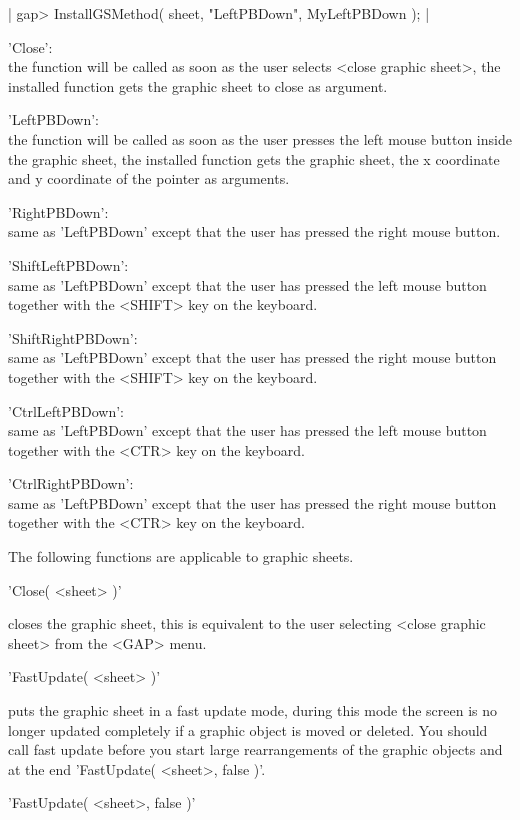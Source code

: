 |    gap> InstallGSMethod( sheet, "LeftPBDown", MyLeftPBDown ); |

'Close':\\
    the function  will  be called  as  soon as  the user  selects  <close
    graphic  sheet>, the installed  function gets  the  graphic  sheet to
    close as argument.

'LeftPBDown':\\
    the function will be   called as soon as  the  user presses  the left
    mouse button  inside the graphic  sheet, the installed function  gets
    the graphic sheet, the x  coordinate and y  coordinate of the pointer
    as arguments.
    
'RightPBDown':\\
    same as 'LeftPBDown' except that the user has pressed the right mouse
    button.

'ShiftLeftPBDown':\\
    same as 'LeftPBDown' except that the user  has pressed the left mouse
    button together with the <SHIFT> key on the keyboard.

'ShiftRightPBDown':\\
    same as 'LeftPBDown' except that the user has pressed the right mouse
    button together with the <SHIFT> key on the keyboard.

'CtrlLeftPBDown':\\
    same as 'LeftPBDown' except that the user has  pressed the left mouse
    button together with the <CTR> key on the keyboard.

'CtrlRightPBDown':\\
    same as 'LeftPBDown' except that the user has pressed the right mouse
    button together with the <CTR> key on the keyboard.

The following functions are applicable to graphic sheets.

'Close( <sheet> )'

closes the  graphic sheet, this is equivalent  to  the user selecting
<close graphic sheet> from the <GAP> menu.

'FastUpdate( <sheet> )'

puts the graphic sheet in a fast update mode, during this mode the screen
is no longer updated completely if a graphic  object is moved or deleted.
You should call fast update before  you start large rearrangements of the
graphic objects and at the end 'FastUpdate( <sheet>, false )'.

'FastUpdate( <sheet>, false )'

